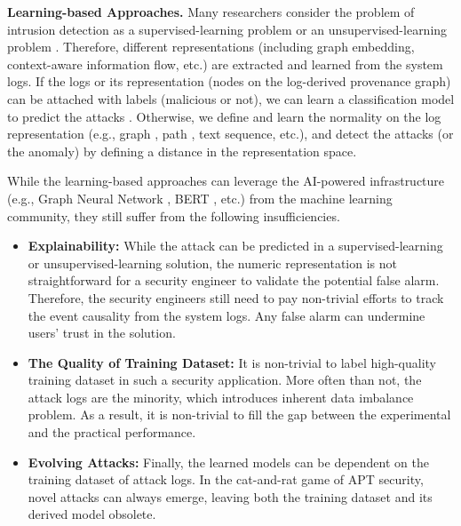 \noindent\textbf{Learning-based Approaches.}
Many researchers consider the problem of intrusion detection as a supervised-learning problem \cite{liu2018towards,hassan2019nodoze,hassan2020we} or an unsupervised-learning problem \cite{wang2022threatrace,han2020unicorn,wang2020you}.
Therefore, different representations \cite{zeng2021watson, zengy2022shadewatcher} (including graph embedding, context-aware information flow, etc.) are extracted and learned from the system logs.
If the logs or its representation (nodes on the log-derived provenance graph) can be attached with labels (malicious or not),
we can learn a classification model to predict the attacks \cite{xxx}.
Otherwise, we define and learn the normality on the log representation (e.g., graph \cite{manzoor2016fast,han2020unicorn,li2021hierarchical,yang2023prographer,cheng2023kairos}, path \cite{wang2020you,alsaheel2021atlas}, text sequence, etc.), and detect the attacks (or the anomaly) by
defining a distance in the representation space.

While the learning-based approaches can leverage 
the AI-powered infrastructure (e.g., Graph Neural Network \cite{xx}, BERT \cite{xx}, etc.) from the machine learning community,
they still suffer from the following insufficiencies.

\begin{itemize}[leftmargin=*]
  \item \textbf{Explainability:}
    While the attack can be predicted in a supervised-learning or unsupervised-learning solution,
    the numeric representation is not straightforward for a security engineer to 
    validate the potential false alarm.
    Therefore, the security engineers still need to pay non-trivial efforts to 
    track the event causality from the system logs.
    Any false alarm can undermine users' trust in the solution.
  \item \textbf{The Quality of Training Dataset:}
    It is non-trivial to label high-quality training dataset in such a security application.
    More often than not, the attack logs are the minority, which introduces inherent data imbalance problem.
    As a result, it is non-trivial to fill the gap between the experimental and the practical performance.
  \item \textbf{Evolving Attacks:}
    Finally, the learned models can be dependent on the training dataset of attack logs.
    In the cat-and-rat game of APT security,
    novel attacks can always emerge, 
    leaving both the training dataset and its derived model obsolete.
\end{itemize}


